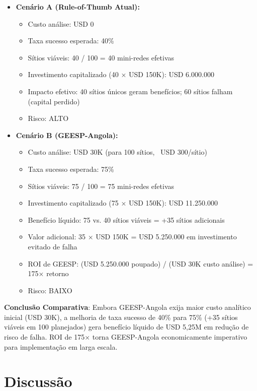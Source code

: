 \documentclass[12pt, a4paper]{article}
\begin{document}
\begin{itemize}
\item \textbf{Cenário A (Rule-of-Thumb Atual):} 
  \begin{itemize}
  \item Custo análise: USD 0
  \item Taxa sucesso esperada: 40\%
  \item Sítios viáveis: 40 / 100 = 40 mini-redes efetivas
  \item Investimento capitalizado (40 × USD 150K): USD 6.000.000
  \item Impacto efetivo: 40 sítios únicos geram benefícios; 60 sítios falham (capital perdido)
  \item Risco: ALTO
  \end{itemize}

\item \textbf{Cenário B (GEESP-Angola):}
  \begin{itemize}
  \item Custo análise: USD 30K (para 100 sítios, ~USD 300/sítio)
  \item Taxa sucesso esperada: 75\%
  \item Sítios viáveis: 75 / 100 = 75 mini-redes efetivas
  \item Investimento capitalizado (75 × USD 150K): USD 11.250.000
  \item Benefício líquido: 75 vs. 40 sítios viáveis = +35 sítios adicionais
  \item Valor adicional: 35 × USD 150K = USD 5.250.000 em investimento evitado de falha
  \item ROI de GEESP: (USD 5.250.000 poupado) / (USD 30K custo análise) = 175× retorno
  \item Risco: BAIXO
  \end{itemize}
\end{itemize}

\textbf{Conclusão Comparativa}: Embora GEESP-Angola exija maior custo analítico inicial (USD 30K), a melhoria de taxa sucesso de 40\% para 75\% (+35 sítios viáveis em 100 planejados) gera benefício líquido de USD 5,25M em redução de risco de falha. ROI de 175× torna GEESP-Angola economicamente imperativo para implementação em larga escala.


\section{Discussão}
\end{document}
